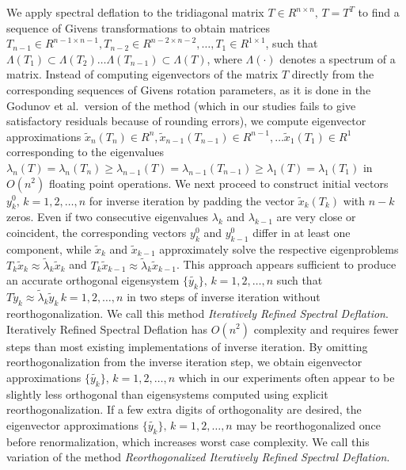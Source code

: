\documentclass{report}
\begin{document}
We apply spectral deflation to the tridiagonal matrix $T \in
R^{n\times n},\, T = T^T$ to find a sequence of Givens
transformations to obtain matrices $T_{n-1} \in R^{n-1 \times
n-1}, T_{n-2} \in R^{n-2 \times n-2},\ldots, T_{1} \in R^{1\times
1}$, such that $\Lambda(T_{1}) \subset \Lambda(T_{2})\ldots
\Lambda(T_{n-1}) \subset \Lambda(T)$, where $\Lambda(\cdot)$
denotes a spectrum of a matrix. Instead of computing eigenvectors
of the matrix $T$ directly from the corresponding sequences of
Givens rotation parameters, as it is done in the Godunov et al.\
version of the method (which in our studies fails to give
satisfactory residuals because of rounding errors), we compute
eigenvector approximations $\tilde{x}_n(T_n) \in R^{n},
\tilde{x}_{n-1}(T_{n-1}) \in R^{n-1}, \ldots \tilde{x}_1(T_1) \in
R^{1}$ corresponding to the eigenvalues
$\lambda_n(T)=\lambda_n(T_n) \geq
\lambda_{n-1}(T)=\lambda_{n-1}(T_{n-1}) \geq
\lambda_1(T)=\lambda_1(T_1)$ in $O(n^2)$ floating point
operations. We next proceed to construct initial vectors
${y^0_k},\, k = 1, 2, \ldots, n$ for inverse iteration by padding
the vector $\tilde{x}_k(T_{k})$ with $n-k$ zeros. Even if two
consecutive eigenvalues $\lambda_k$ and $\lambda_{k-1}$ are very
close or coincident, the corresponding vectors ${y^0_k}$ and
${y^0_{k-1}}$ differ in at least one component, while
$\tilde{x}_k$ and $\tilde{x}_{k-1}$ approximately solve the
respective eigenproblems $T_{k} \tilde{x}_{k} \approx
\tilde{\lambda}_{k} \tilde{x}_k$ and $T_{k} \tilde{x}_{k-1}
\approx \tilde{\lambda}_{k} \tilde{x}_{k-1}$. This approach
appears sufficient to produce an accurate orthogonal eigensystem
$\{\tilde{y_k}\},\, k = 1,2, \ldots, n$ such that $T \tilde{y}_k
\approx \tilde{\lambda}_k \tilde{y}_k\, k = 1,2, \ldots, n$ in
two steps of inverse iteration without reorthogonalization. We
call this method \emph{Iteratively Refined Spectral Deflation}.
Iteratively Refined Spectral Deflation has $O(n^2)$ complexity and
requires fewer steps than most existing implementations of
inverse iteration. By omitting reorthogonalization from the
inverse iteration step, we obtain eigenvector approximations
$\{\tilde{y_k}\},\, k = 1,2, \ldots, n$ which in our experiments
often appear to be slightly less orthogonal than eigensystems
computed using explicit reorthogonalization. If a few extra
digits of orthogonality are desired, the eigenvector
approximations $\{\tilde{y_k}\},\, k = 1,2, \ldots, n$ may be
reorthogonalized once before renormalization, which increases
worst case complexity. We call this variation of the method
\emph{Reorthogonalized Iteratively Refined Spectral Deflation}.
\end{document}
